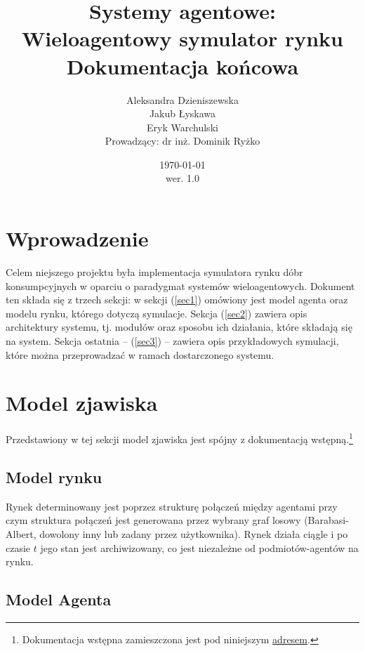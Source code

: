 \documentclass{article}
\title{Systemy agentowe: \\ Wieloagentowy symulator rynku\\ Dokumentacja końcowa}
\author{Aleksandra Dzieniszewska \\ Jakub Łyskawa \\ Eryk Warchulski\\ Prowadzący: dr inż. Dominik Ryżko}%
\date{\today\\wer. 1.0}
\begin{document}
\maketitle
{\footnotesize{\tableofcontents}}
\vspace*{\fill}

\newpage
\section{Wprowadzenie}

Celem niejszego projektu była implementacja symulatora rynku dóbr konsumpcyjnych w oparciu o paradygmat systemów wieloagentowych. 
Dokument ten składa się z trzech sekcji: w sekcji (\ref{sec1}) omówiony jest model agenta oraz modelu rynku, którego dotyczą symulacje.
Sekcja (\ref{sec2}) zawiera opis architektury systemu, tj. modułów 
oraz sposobu ich działania, które składają się na system. Sekcja ostatnia -- (\ref{sec3}) -- zawiera opis przykładowych symulacji, które
można przeprowadzać w ramach dostarczonego systemu.

\section{Model zjawiska \label{sec1}}

Przedstawiony w tej sekcji model zjawiska jest spójny z dokumentacją wstępną.\footnote{Dokumentacja wstępna zamieszczona jest pod niniejszym \href{https://github.com/warbarbye/Multi-agent-market/blob/master/doc/dokumentacja-wstepna.pdf}{adresem}.} 

\subsection{Model rynku}
Rynek determinowany jest poprzez strukturę połączeń między agentami przy czym struktura połączeń jest generowana przez wybrany graf losowy
(Barabasi-Albert, dowolony inny lub zadany przez użytkownika). Rynek działa ciągle i po czasie $t$ jego stan jest archiwizowany, co jest niezależne od podmiotów-agentów na rynku.

\subsection{Model Agenta}
\end{document}
